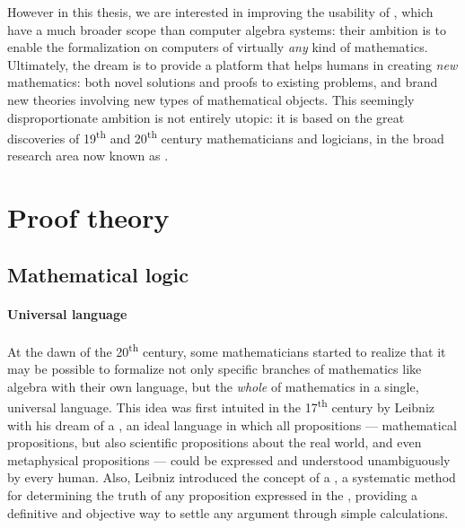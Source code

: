 However in this thesis, we are interested in improving the usability of
, which have a much broader scope than computer algebra
systems: their ambition is to enable the formalization on computers of virtually
\emph{any} kind of mathematics. Ultimately, the dream is to provide a platform
that helps humans in creating \emph{new} mathematics: both novel solutions and
proofs to existing problems, and brand new theories involving new types of
mathematical objects. This seemingly disproportionate ambition is not entirely
utopic: it is based on the great discoveries of 19\textsuperscript{th} and
20\textsuperscript{th} century mathematicians and logicians, in the broad
research area now known as .

\section{Proof theory}

\subsection{Mathematical logic}

\paragraph{Universal language}

At the dawn of the 20\textsuperscript{th} century, some mathematicians started
to realize that it may be possible to formalize not only specific branches of
mathematics like algebra with their own language, but the \emph{whole} of
mathematics in a single, universal language. This idea was first intuited in the
17\textsuperscript{th} century by Leibniz with his dream of a
, an ideal language in which all propositions
--- mathematical propositions, but also scientific propositions about the real
world, and even metaphysical propositions --- could be expressed and understood
unambiguously by every human. Also, Leibniz introduced the concept of a
, a systematic method for determining the truth of
any proposition expressed in the , providing a
definitive and objective way to settle any argument through simple
calculations.

